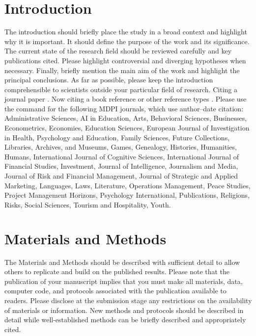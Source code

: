 \documentclass[geomatics,article,submit,moreauthors]{Definitions/mdpi}
\begin{document}
\setcounter{section}{-1} %


\section{Introduction}

The introduction should briefly place the study in a broad context and highlight why it is important. It should define the purpose of the work and its significance. The current state of the research field should be reviewed carefully and key publications cited. Please highlight controversial and diverging hypotheses when necessary. Finally, briefly mention the main aim of the work and highlight the principal conclusions. As far as possible, please keep the introduction comprehensible to scientists outside your particular field of research. Citing a journal paper \citep{ref-journal}.  Now citing a book reference \citep{ref-book1,ref-book2} or other reference types \citep{ref-unpublish,ref-url}. Please use the command \citep{ref-proceeding,ref-thesis} for the following MDPI journals, which use author--date citation: Administrative Sciences, AI in Education, Arts, Behavioral Sciences, Businesses, Econometrics, Economies, Education Sciences, European Journal of Investigation in Health, Psychology and Education, Family Sciences, Future Collections, Libraries, Archives, and Museums, Games, Genealogy, Histories, Humanities, Humans, International Journal of Cognitive Sciences, International Journal of Financial Studies, Investment, Journal of Intelligence, Journalism and Media, Journal of Risk and Financial Management, Journal of Strategic and Applied Marketing, Languages, Laws, Literature, Operations Management, Peace Studies, Project Management Horizons, Psychology International, Publications, Religions, Risks, Social Sciences, Tourism and Hospitality, Youth. 

\section{Materials and Methods}

The Materials and Methods should be described with sufficient detail to allow others to replicate and build on the published results. Please note that the publication of your manuscript implies that you must make all materials, data, computer code, and protocols associated with the publication available to readers. Please disclose at the submission stage any restrictions on the availability of materials or information. New methods and protocols should be described in detail while well-established methods can be briefly described and appropriately cited.
\end{document}
